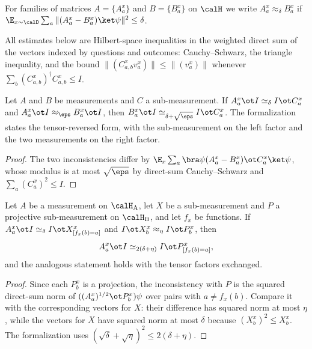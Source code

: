 \begin{definition}\label{def:approx_delta}
	\leanok
	For families of matrices $A=\{A^x_a\}$ and $B=\{B^x_a\}$ on $\calH$ we
	write $A^x_a\approx_\delta B^x_a$ if
	$\E_{x\sim\calD}\sum_a\|(A^x_a-B^x_a)\ket\psi\|^2\le\delta$.
\end{definition}

All estimates below are Hilbert-space inequalities in the weighted direct sum
of the vectors indexed by questions and outcomes: Cauchy--Schwarz, the
triangle inequality, and the bound
$\|(C^x_{a,b}v^x_a)\|\le\|(v^x_a)\|$ whenever
$\sum_b(C^x_{a,b})^\dagger C^x_{a,b}\le I$.

\begin{proposition}\label{prop:triangle-sub}
	\leanok
	Let $A$ and $B$ be measurements and $C$ a sub-measurement.  If
	$A^x_a\ot I\simeq_\delta I\ot C^x_a$ and $A^x_a\ot I\approx_\eps B^x_a\ot I$,
	then $B^x_a\ot I\simeq_{\delta+\sqrt\eps}I\ot C^x_a$.  The formalization
	states the tensor-reversed form, with the sub-measurement on the left
	factor and the two measurements on the right factor.
\end{proposition}
\begin{proof}
	\leanok
	The two inconsistencies differ by
	$\E_x\sum_a\bra\psi(A^x_a-B^x_a)\ot C^x_a\ket\psi$, whose modulus is at
	most $\sqrt\eps$ by direct-sum Cauchy--Schwarz and $\sum_a(C^x_a)^2\le I$.
\end{proof}

\begin{proposition}\label{prop:round-right-submeasurement}
	\leanok
	Let $A$ be a measurement on $\calH_{\mathrm A}$, let $X$ be a
	sub-measurement and $P$ a projective sub-measurement on
	$\calH_{\mathrm B}$, and let $f_x$ be functions.  If
	$A^x_a\ot I\simeq_\delta I\ot X^x_{[f_x(b)=a]}$ and
	$I\ot X^x_b\approx_\eta I\ot P^x_b$, then
	\[
		A^x_a\ot I\simeq_{2(\delta+\eta)}I\ot P^x_{[f_x(b)=a]},
	\]
	and the analogous statement holds with the tensor factors exchanged.
\end{proposition}
\begin{proof}
	\leanok
	Since each $P^x_b$ is a projection, the inconsistency with $P$ is the
	squared direct-sum norm of $((A^x_a)^{1/2}\ot P^x_b)\psi$ over pairs with
	$a\ne f_x(b)$.  Compare it with the corresponding vectors for $X$: their
	difference has squared norm at most $\eta$, while the vectors for $X$ have
	squared norm at most $\delta$ because $(X^x_b)^2\le X^x_b$.  The
	formalization uses $(\sqrt\delta+\sqrt\eta)^2\le2(\delta+\eta)$.
\end{proof}

